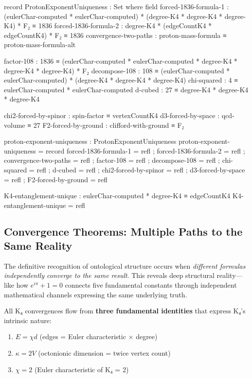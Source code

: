 \documentclass[11pt,a4paper]{book}
\begin{document}
\begin{code}
record ProtonExponentUniqueness : Set where
  field
    forced-1836-formula-1   : (eulerChar-computed * eulerChar-computed) * (degree-K4 * degree-K4 * degree-K4) * F₂ ≡ 1836
    forced-1836-formula-2   : degree-K4 * (edgeCountK4 * edgeCountK4) * F₂ ≡ 1836
    convergence-two-paths   : proton-mass-formula ≡ proton-mass-formula-alt
    
    factor-108 : 1836 ≡ (eulerChar-computed * eulerChar-computed * degree-K4 * degree-K4 * degree-K4) * F₂
    decompose-108 : 108 ≡ (eulerChar-computed * eulerChar-computed) * (degree-K4 * degree-K4 * degree-K4)
    chi-squared : 4 ≡ eulerChar-computed * eulerChar-computed
    d-cubed : 27 ≡ degree-K4 * degree-K4 * degree-K4
    
    chi2-forced-by-spinor : spin-factor ≡ vertexCountK4
    d3-forced-by-space : qcd-volume ≡ 27
    F2-forced-by-ground : clifford-with-ground ≡ F₂

proton-exponent-uniqueness : ProtonExponentUniqueness
proton-exponent-uniqueness = record
  { forced-1836-formula-1 = refl
  ; forced-1836-formula-2 = refl
  ; convergence-two-paths = refl
  ; factor-108 = refl
  ; decompose-108 = refl
  ; chi-squared = refl
  ; d-cubed = refl
  ; chi2-forced-by-spinor = refl
  ; d3-forced-by-space = refl
  ; F2-forced-by-ground = refl
  }
\end{code}

\begin{code}
K4-entanglement-unique : eulerChar-computed * degree-K4 ≡ edgeCountK4
K4-entanglement-unique = refl
\end{code}

\subsection{Convergence Theorems: Multiple Paths to the Same Reality}
\label{sec:convergence-theorems}

The definitive recognition of ontological structure occurs when 
\emph{different formulas independently converge to the same result}. This reveals deep structural reality---like how $e^{i\pi} + 1 = 0$ connects 
five fundamental constants through independent mathematical channels expressing the same underlying truth.

All K₄ convergences flow from \textbf{three fundamental identities} that express K₄'s intrinsic nature:
\begin{enumerate}
\item $E = \chi d$ (edges = Euler characteristic $\times$ degree)
\item $\kappa = 2V$ (octonionic dimension = twice vertex count)
\item $\chi = 2$ (Euler characteristic of K₄ = 2)
\end{enumerate}
\end{document}
